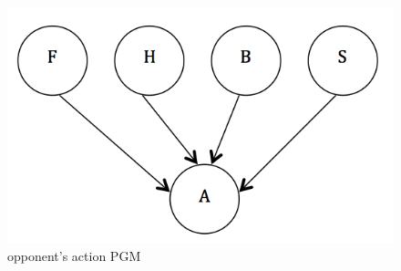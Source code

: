 \begin{figure}[h!]
  	\centering
 	\includegraphics[scale = .55]{fig1}
	\caption{opponent's action PGM}
\end{figure}
